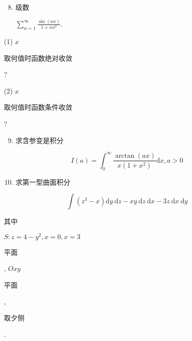 \documentclass[10pt]{article}
\begin{document}
\begin{enumerate}
  \setcounter{enumi}{7}
  \item \begin{CJK}{UTF8}{mj}级数\end{CJK} $\sum_{n=1}^{\infty} \frac{\sin (n x)}{1+n x^{2}}$.
\end{enumerate}
(1) $x$ \begin{CJK}{UTF8}{mj}取何值时函数绝对收敛\end{CJK}?

(2) $x$ \begin{CJK}{UTF8}{mj}取何值时函数条件收敛\end{CJK}?

\begin{enumerate}
  \setcounter{enumi}{8}
  \item \begin{CJK}{UTF8}{mj}求含参变是积分\end{CJK}
\end{enumerate}
$$
I(a)=\int_{0}^{\infty} \frac{\arctan (a x)}{x\left(1+x^{2}\right)} \mathrm{d} x, a>0
$$

\begin{enumerate}
  \setcounter{enumi}{9}
  \item \begin{CJK}{UTF8}{mj}求第一型曲面积分\end{CJK}
\end{enumerate}
$$
\int\left(z^{3}-x\right) \mathrm{d} y \mathrm{~d} z-x y \mathrm{~d} z \mathrm{~d} x-3 z \mathrm{~d} x \mathrm{~d} y
$$
\begin{CJK}{UTF8}{mj}其中\end{CJK} $S: z=4-y^{2}, x=0, x=3$ \begin{CJK}{UTF8}{mj}平面\end{CJK}, $O x y$ \begin{CJK}{UTF8}{mj}平面\end{CJK}, \begin{CJK}{UTF8}{mj}取夕侧\end{CJK}.
\end{document}
